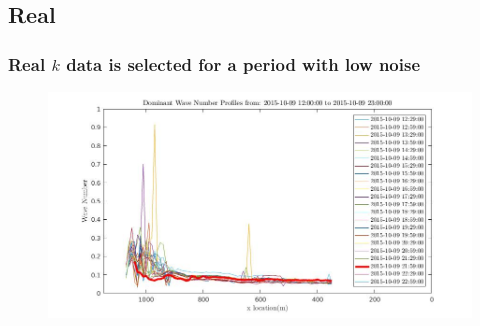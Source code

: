 \documentclass[7pt]{beamer}
\begin{document}
\begin{frame}
\begin{columns}
\begin{figure}[H]
	 		\end{figure}
	\end{columns}
\end{frame}

\subsection{Real}

\begin{frame}
	\frametitle{Real $k$ data is selected for a period with low noise}
		\begin{figure}
			\includegraphics[width=1.0\linewidth]{img/Real_k_data.jpg}
		\end{figure}
\end{frame}
\end{document}
